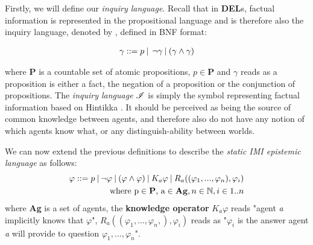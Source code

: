 Firstly, we will define our \textit{inquiry language}. Recall that in
\textbf{DEL}s, factual information is represented in the propositional language
and is therefore also the inquiry language, denoted by \oracle, defined in BNF
format:

\begin{align}
    \gamma::= p \:|\:\:\neg\gamma\:|\:(\gamma\land\gamma) \label{eq:1}
\end{align}

where \textbf{P} is a countable set of atomic propositions, $p \in\mathbf{P}$
and $\gamma$ reads as a proposition is either a fact, the negation of a
proposition or the conjunction of propositions. The \textit{inquiry language}
$\mathscr{I}$ is simply the symbol representing factual information based on
Hintikka \cite{hintikka88}. It should be perceived as being the source of
common knowledge between agents, and therefore also do not have any notion of
which agents know what, or any distinguish-ability between worlds.

We can now extend the previous definitions to describe the \textit{static IMI
    epistemic language} \staticlang\: as follows:
\begin{align}
    \begin{split}
        \varphi ::= p \:|\:\neg\varphi\:|\:(\varphi \land \varphi) \:|\: K_a\varphi \:|\: R_a((\varphi_1,...,\varphi_n), \varphi_i) \\ \text{where p} \in \text{\textbf{P}}\text{, a} \in \text{\textbf{Ag}}, n \in \mathbb{N}, i \in 1..n \label{eq:2}
    \end{split}
\end{align}
where \textbf{Ag} is a set of agents, the \textbf{knowledge operator} $K_a\varphi$ reads "agent \textit{a} implicitly knows that $\varphi$",  $R_a((\varphi_1,...,\varphi_n,), \varphi_i)$ reads as "$\varphi_i$ is the answer agent \textit{a} will provide to question $\varphi_1,...,\varphi_n$". \\

